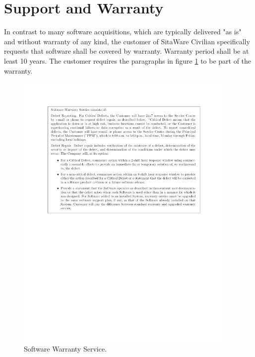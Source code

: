 \section{Support and Warranty}

In contrast to many software acquisitions, which are typically delivered "as is" and without warranty of any kind, the customer of SitaWare Civilian specifically requests that software shall be covered by warranty. Warranty period shall be at least 10 years. The customer requires the paragraphs in figure \ref{fig:warranty} to be part of the warranty.

\begin{figure}[H]
\centering
\includegraphics[trim = 25mm 135mm 20mm 25mm, width=0.95\textwidth]
{billeder/warranty.pdf}
\caption{Software Warranty Service.}
\label{fig:warranty}
\end{figure}